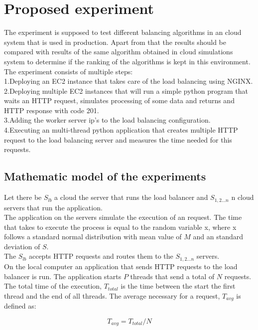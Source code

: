 \documentclass[conference]{IEEEtran}
\newcommand\tab[1][.3cm]{\hspace*{#1}}
\begin{document}
\section{Proposed experiment}
The experiment is supposed to test different balancing algorithms in an cloud system that is used in production.
Apart from that the results should be compared with results of the same algorithm obtained in cloud simulations system to determine if the ranking of the algorithms is kept in this environment.
\\The experiment consists of multiple steps:
\\1.Deploying an EC2 instance that takes care of the load balancing using NGINX.
\\2.Deploying multiple EC2 instances that will run a simple python program that waits an HTTP request, simulates processing of some data and returns and HTTP response with code 201.
\\3.Adding the worker server ip's to the load balancing configuration.
\\4.Executing an multi-thread python application that creates multiple HTTP request to the load balancing server and measures the time needed for this requests.

\subsection{Mathematic model of the experiments}
Let there be $S_{lb}$ a cloud the server that runs the load balancer and $S_{1,2...n}$ n cloud servers that run the application.
\\ \tab The application on the servers simulate the execution of an request. The time that takes to execute the process is equal to the random variable x, where x follows a standard normal distribution with mean value of $M$ and an standard deviation of $S$.
\\ \tab The $S_{lb}$ accepts HTTP requests and routes them to the $S_{1,2...n}$ servers.
\\ \tab On the local computer an application that sends HTTP requests to the load balancer is run. The application starts $P$ threads that send a total of $N$ requests. The total time of the execution, $T_{total}$ is the time between the start the first thread and the end of all threads. The average necessary for a request, $T_{avg}$ is defined as:

\[ T_{avg} = T_{total} / N \]
\end{document}
